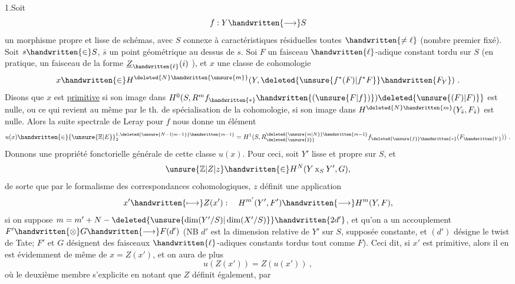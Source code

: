 
1.\quad Soit
\[
f:Y\handwritten{\longrightarrow}S
\]
un morphisme propre et lisse de schémas, avec $S$  connexe à caractéristiques résiduelles toutes $\handwritten{\ne\ell}$ (nombre premier fixé). Soit $s\handwritten{\in}S$, $\bar s$ un point géométrique au dessus de $s$. Soi $F$ un faisceau $\handwritten{\ell}$-adique constant tordu sur $S$ (en pratique, un faisceau de la forme $\underline{Z}_{\handwritten{\ell}}(i)$ ), et $x$ une classe de cohomologie
\[
x\handwritten{\in}H^{\deleted{N}\handwritten{\unsure{m}}}(Y,\deleted{\unsure{f^*(F)|f^*F}}\handwritten{F_Y})\ .
\]
Disons que $x$ est \uline{primitive} si son image dans $H^0(S,R^m f_{\handwritten{*}}\handwritten{(\unsure{F|f})})\deleted{\unsure{(F)|F)}}$ est nulle, ou ce qui revient au même par le th. de spécialisation de la cohomologie, si son image dans $H^{\deleted{N}\handwritten{m}}(Y_{\bar s},F_{\bar s})$ est nulle. Alors la suite spectrale de Leray pour $f$ nous donne un élément
\[
u(x)\handwritten{\in}{\unsure{\mathbb{E}|E}}_2^{1,\deleted{\unsure{N-1|m-1}}\handwritten{m-1}}=H^1(S,R^{\deleted{\unsure{m|N}}\handwritten{m-1}}_{\deleted{\unsure{2}}}f_{\deleted{\unsure{f}}\handwritten{*}}(F_{\handwritten{Y}}))\ .
\]
Donnons une propriété fonctorielle générale de cette classe $u(x)$. Pour ceci, soit $Y'$ lisse et propre sur $S$, et
\[
\unsure{\mathbb{Z}|Z|z}\handwritten{\in}H^N(Y\mathbin{\mathrm{x}}_S Y',G),
\]
de sorte que par le formalisme des correspondances cohomologiques, $z$ définit une application
\[
x'\handwritten{\longmapsto}Z(x'): \quad H^{m'}(Y',F')\handwritten{\longrightarrow}H^m(Y,F),
\]
si on suppose $m=m'+N-\deleted{\unsure{\dim(Y'/S)|\dim(X'/S)}}\handwritten{2d'}$, et qu'on a un accouplement $F'\handwritten{\otimes}G\handwritten{\longrightarrow}F(d')$ (NB $d'$ est la dimension relative de $Y'$ sur $S$, supposée constante, et $(d')$ désigne le twist de Tate; $F'$ et $G$ désignent des faisceaux $\handwritten{\ell}$-adiques constants tordus  tout comme $F$). Ceci dit, si $x'$ est primitive, alors il en est évidemment de même de $x=Z(x')$, et on aura de plus
\[
u(Z(x'))=Z(u(x'))\ ,
\]
où le deuxième membre s'explicite en notant que $Z$ définit également, par
